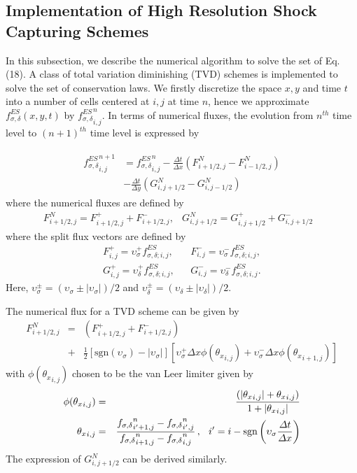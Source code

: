 \documentclass{rsproca}%
\begin{document}
\subsection{Implementation of High Resolution Shock Capturing Schemes}
\label{TVD}
In this subsection, we describe the numerical algorithm to solve the set  of Eq. (18).  A class of total variation diminishing (TVD) schemes is implemented to solve the set of conservation laws.   We firstly discretize the space $x,y$  and time $t$ into a number of cells centered at $i,j$ at time $n$, hence we approximate $f^{ES}_{\sigma,\delta}(x,y,t)$ by ${f^{ES}_{\sigma,\delta}}_{i,j}^{n}$. In terms of numerical fluxes, the evolution from $n^{th}$ time level to $(n+1)^{th}$ time level is expressed by

\begin{align}
	\begin{split}
{f^{ES}_{\sigma,\delta}}_{i,j}^{n+1} &= {f^{ES}_{\sigma,\delta}}_{i,j}^{n}
-\frac{\Delta t}{\Delta x}\left(F_{i+1/2,j}^N-F_{i-1/2,j}^N\right) \\
&-\frac{\Delta t}{\Delta y}\left(G_{i,j+1/2}^N - G_{i,j-1/2}^N\right)
	\end{split}
\end{align}
where the numerical fluxes are defined by
\begin{align}
F_{i+1/2,j}^N=F_{i+1/2,j}^+ + F_{i+1/2,j}^-, &G_{i,j+1/2}^N=G_{i,j+1/2}^+ + G_{i,j+1/2}^-&
\end{align}
where the split flux vectors are defined by
\begin{align}
&F_{i,j}^{+} = \upsilon_\sigma^+ f^{ES}_{\sigma,\delta;i,j},& &F_{i,j}^{-} = \upsilon_\sigma^-f^{ES}_{\sigma,\delta;i,j},& \nonumber \\
&G_{i,j}^{+} = \upsilon_\delta^+ f^{ES}_{\sigma,\delta;i,j},& &G_{i,j}^{-} = \upsilon_\delta^-f^{ES}_{\sigma,\delta;i,j}.&
\end{align}
Here, $\upsilon_\sigma^{\pm} = (\upsilon_\sigma \pm |\upsilon_\sigma |)/2$ and $\upsilon_\delta^{\pm} = (\upsilon_\delta \pm |\upsilon_\delta |)/2$.

The numerical flux for a TVD scheme can be given by
\begin{eqnarray}
F_{i+1/2,j}^N &=& \left(F_{i+1/2,j}^++F_{i+1/2,j}^-\right)\nonumber\\
&+&\frac{1}{2}\left[{\mbox{sgn}}(\upsilon_{\sigma})-|\upsilon_{\sigma}|\right]\left[\upsilon_\sigma^+\Delta x \phi({\theta_x}_{i,j})+\upsilon_\sigma^-\Delta x \phi({\theta_x}_{i+1,j})\right]
\end{eqnarray}
with $\phi({\theta_x}_{i,j})$ chosen to be the van Leer limiter \cite{vanLeer1979101} given by
\begin{eqnarray}
\phi({\theta_x}_{i,j})&=&\frac{(|{\theta_x}_{i,j}|+{\theta_x}_{i,j})}{1+|{\theta_x}_{i,j}|}\nonumber\\
{\theta_x}_{i,j}&=&\frac{{f_{\sigma,\delta}}_{i'+1,j}^{n}-{f_{\sigma,\delta}}_{i',j}^{n}}{{f_{\sigma,\delta}}_{i+1,j}^{n}-{f_{\sigma,\delta}}_{i,j}^{n}}\,,\hspace{0.1in} i'=i-{\mbox{sgn}}\left(\upsilon_\sigma\frac{\Delta t}{\Delta x}\right)
\end{eqnarray}
The expression of $G_{i,j+1/2}^N$ can be derived similarly.
\end{document}
